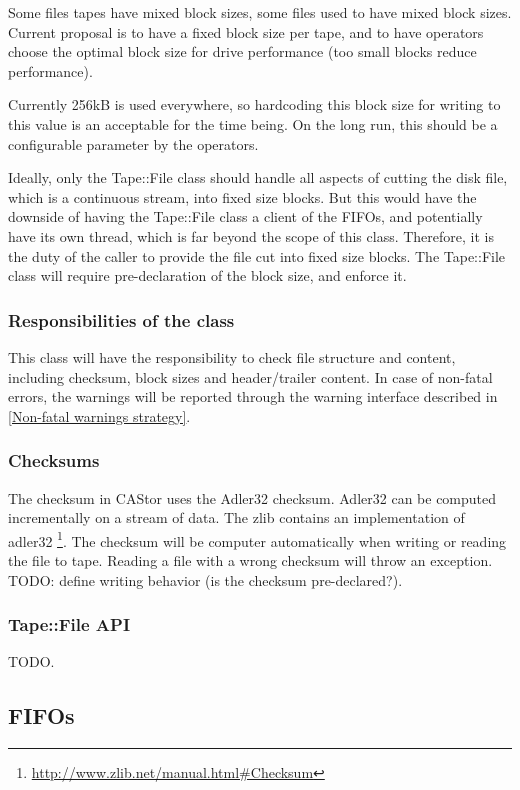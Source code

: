 Some files tapes have mixed block sizes,
some files used to have mixed block sizes. Current proposal is to have a fixed
block size per tape, and to have operators choose the optimal block size for 
drive performance (too small blocks reduce performance). 

Currently 256kB is used everywhere, so hardcoding this block size for writing 
to this value is an acceptable for the time being. On the long run, this should 
be a configurable parameter by the operators.

Ideally, only the Tape::File class should handle all aspects of cutting the disk
file, which is a continuous stream, into fixed size blocks. But this would have the 
downside of having the Tape::File class a client of the FIFOs, and potentially 
have its own thread, which is far beyond the scope of this class. Therefore, it 
is the duty of the caller to provide the file cut into fixed size blocks.
The Tape::File class will require pre-declaration of the block size, and 
enforce it.

\subsubsection{Responsibilities of the class}
This class will have the responsibility to check file structure and content,
including checksum, block sizes and header/trailer content. In case of non-fatal
errors, the warnings will be reported through the warning interface described in
\ref{Non-fatal warnings strategy}.

\subsubsection{Checksums}
The checksum in CAStor uses the Adler32 checksum. Adler32 can be computed 
incrementally on a stream of data. The zlib contains an implementation of adler32
\footnote{\href{http://www.zlib.net/manual.html\#Checksum}{http://www.zlib.net/manual.html\#Checksum}}.
The checksum will be computer automatically when writing or reading the file to
tape. Reading a file with a wrong checksum will throw an exception.
TODO: define writing behavior (is the checksum pre-declared?).

\subsubsection{Tape::File API}
TODO.



\subsection{FIFOs}

